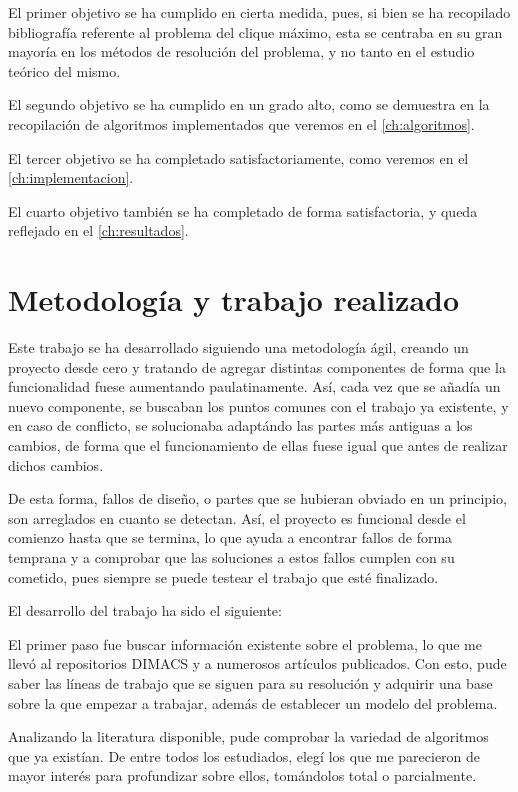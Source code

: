 El primer objetivo se ha cumplido en cierta medida, pues, si bien se ha recopilado
bibliografía referente al problema del clique máximo, esta se centraba en su gran
mayoría en los métodos de resolución del problema, y no tanto en el estudio teórico
del mismo.

El segundo objetivo se ha cumplido en un grado alto, como se demuestra en la recopilación
de algoritmos implementados que veremos en el \autoref{ch:algoritmos}.

El tercer objetivo se ha completado satisfactoriamente, como veremos en el \autoref{ch:implementacion}.

El cuarto objetivo también se ha completado de forma satisfactoria, y queda
reflejado en el \autoref{ch:resultados}.

\section{Metodología y trabajo realizado}

Este trabajo se ha desarrollado siguiendo una metodología ágil, creando un proyecto
desde cero y tratando de agregar distintas componentes de forma que la funcionalidad
fuese aumentando paulatinamente. Así, cada vez que se añadía un nuevo componente,
se buscaban los puntos comunes con el trabajo ya existente, y en caso de conflicto,
se solucionaba adaptándo las partes más antiguas a los cambios, de forma que el
funcionamiento de ellas fuese igual que antes de realizar dichos cambios.

De esta forma, fallos de diseño, o partes que se hubieran obviado en un principio,
son arreglados en cuanto se detectan. Así, el proyecto es funcional desde el comienzo
hasta que se termina, lo que ayuda a encontrar fallos de forma temprana y a comprobar
que las soluciones a estos fallos cumplen con su cometido, pues siempre se puede
testear el trabajo que esté finalizado.

El desarrollo del trabajo ha sido el siguiente:

El primer paso fue buscar información existente sobre el problema, lo que me llevó
al repositorios DIMACS y a numerosos artículos publicados. Con esto, pude saber
las líneas de trabajo que se siguen para su resolución y adquirir una base sobre
la que empezar a trabajar, además de establecer un modelo del problema.

Analizando la literatura disponible, pude comprobar la variedad de algoritmos
que ya existían. De entre todos los estudiados, elegí los que me parecieron de
mayor interés para profundizar sobre ellos, tomándolos total o parcialmente.

